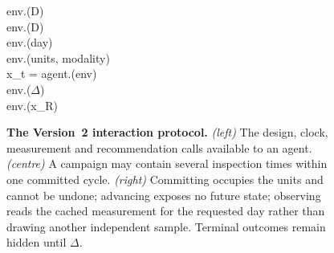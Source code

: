 \begin{figure}[t]
\begin{minipage}[t]{0.335\linewidth}
{\begin{minipage}[t][45mm][t]{\dimexpr\linewidth-2\fboxsep-2\fboxrule}
\hspace*{1em}env.(D)\\
\hspace*{1em}env.(D)\\
\hspace*{1em}env.(day)\\
\hspace*{1em}env.(units, modality)\\
\hspace*{1em}x\_t = agent.(env)\\
\hspace*{1em}env.($\Delta$)\\[2pt]
env.(x\_R)
\end{minipage}}
\end{minipage}
\hfill
\begin{minipage}[t]{0.385\linewidth}
\end{minipage}
\caption{\textbf{The Version~2 interaction protocol.} \emph{(left)} The design,
clock, measurement and recommendation calls available to an agent. \emph{(centre)} A
campaign may contain several inspection times within one committed cycle. \emph{(right)}
Committing occupies the units and cannot be undone; advancing exposes no future state;
observing reads the cached measurement for the requested day rather than drawing another
independent sample. Terminal outcomes remain hidden until $\Delta$.}
\label{fig:protocol}
\end{figure}

